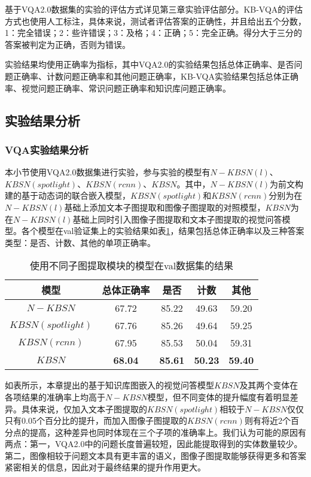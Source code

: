 基于VQA2.0数据集的实验的评估方式详见第三章实验评估部分。KB-VQA的评估方式也使用人工标注，具体来说，测试者评估答案的正确性，并且给出五个分数，1：完全错误；2：些许错误；3：及格；4：正确；5：完全正确。得分大于三分的答案被判定为正确，否则为错误。

实验结果均使用正确率为指标，其中VQA2.0的实验结果包括总体正确率、是否问题正确率、计数问题正确率和其他问题正确率，KB-VQA实验结果包括总体正确率、视觉问题正确率、常识问题正确率和知识库问题正确率。

\subsection{实验结果分析}
\subsubsection{VQA实验结果分析}
本小节使用VQA2.0数据集进行实验，参与实验的模型有$N-KBSN(l)$、$KBSN(spotlight)$、$KBSN(rcnn)$、$KBSN$。其中，$N-KBSN(l)$为前文构建的基于动态词的联合嵌入模型，$KBSN(spotlight)$和$KBSN(rcnn)$分别为在$N-KBSN(l)$基础上添加文本子图提取和图像子图提取的对照模型，$KBSN$为在$N-KBSN(l)$基础上同时引入图像子图提取和文本子图提取的视觉问答模型。各个模型在val验证集上的实验结果如表\ref{4modelres}，结果包括总体正确率以及三种答案类型：是否、计数、其他的单项正确率。
\begin{table}[H]
\centering
\caption{使用不同子图提取模块的模型在val数据集的结果}
\begin{tabular}{c|cccc}
\toprule
模型 & 总体正确率 & 是否 & 计数 & 其他\\
\midrule
$N-KBSN$& 67.72 & 85.22 & 49.63 & 59.20\\
\midrule
$KBSN(spotlight)$&  67.76& 85.26&  49.64& 59.25\\
$KBSN(rcnn)$&  67.95& 85.53&  50.04& 59.31\\
$KBSN$&  \textbf{68.04}& \textbf{85.61}&  \textbf{50.23}& \textbf{59.40}\\
\bottomrule
\end{tabular}
\label{4modelres}
\end{table}

如表所示，本章提出的基于知识库图嵌入的视觉问答模型$KBSN$及其两个变体在各项结果的准确率上均高于$N-KBSN$模型，但不同变体的提升幅度有着明显差异。具体来说，仅加入文本子图提取的$KBSN(spotlight)$相较于$N-KBSN$仅仅只有0.05个百分比的提升，而加入图像子图提取的$KBSN(rcnn)$则有将近2个百分点的提高，这种差异也同时体现在三个子项的准确率上。我们认为可能的原因有两点：第一，VQA2.0中的问题长度普遍较短，因此能提取得到的实体数量较少。第二，图像相较于问题文本具有更丰富的语义，图像子图提取能够获得更多和答案紧密相关的信息，因此对于最终结果的提升作用更大。

